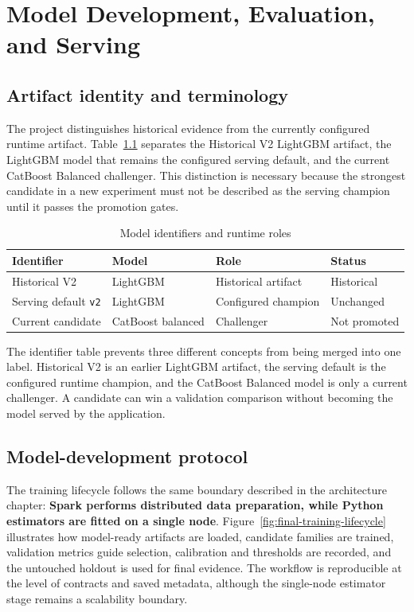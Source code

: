 \chapter{Model Development, Evaluation, and Serving}
\label{chap:model}

\section{Artifact identity and terminology}

The project distinguishes historical evidence from the currently configured runtime artifact. Table~\ref{tab:model-identifiers} separates the Historical V2 LightGBM artifact, the LightGBM model that remains the configured serving default, and the current CatBoost Balanced challenger. This distinction is necessary because the strongest candidate in a new experiment must not be described as the serving champion until it passes the promotion gates.

\begin{table}[H]
\centering
\caption{Model identifiers and runtime roles}
\label{tab:model-identifiers}
\begin{tabular}{llll}
\toprule
\textbf{Identifier} & \textbf{Model} & \textbf{Role} & \textbf{Status}\\
\midrule
Historical V2 & LightGBM & Historical artifact & Historical\\
Serving default \texttt{v2} & LightGBM & Configured champion & Unchanged\\
Current candidate & CatBoost balanced & Challenger & Not promoted\\
\bottomrule
\end{tabular}
\end{table}

The identifier table prevents three different concepts from being merged into
one label. Historical V2 is an earlier LightGBM artifact, the serving default
is the configured runtime champion, and the CatBoost Balanced model is only a
current challenger. A candidate can win a validation comparison without
becoming the model served by the application.

\section{Model-development protocol}

The training lifecycle follows the same boundary described in the architecture chapter: \textbf{Spark performs distributed data preparation, while Python estimators are fitted on a single node}. Figure~\ref{fig:final-training-lifecycle} illustrates how model-ready artifacts are loaded, candidate families are trained, validation metrics guide selection, calibration and thresholds are recorded, and the untouched holdout is used for final evidence. The workflow is reproducible at the level of contracts and saved metadata, although the single-node estimator stage remains a scalability boundary.


